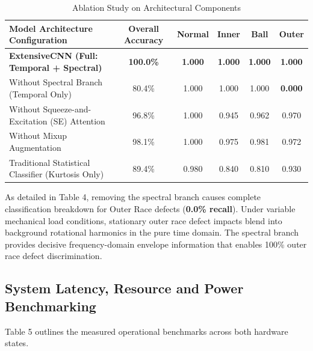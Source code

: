 \documentclass[10pt,journal,onecolumn]{IEEEtran}
\begin{document}
\begin{table}[htbp]
\caption{Ablation Study on Architectural Components}
\begin{center}
\begin{tabular}{lccccc}
\toprule
\textbf{Model Architecture Configuration} & \textbf{Overall Accuracy} & \textbf{Normal} & \textbf{Inner} & \textbf{Ball} & \textbf{Outer} \\
\midrule
\textbf{ExtensiveCNN (Full: Temporal + Spectral)} & \textbf{100.0\%} & \textbf{1.000} & \textbf{1.000} & \textbf{1.000} & \textbf{1.000} \\
Without Spectral Branch (Temporal Only) & 80.4\% & 1.000 & 1.000 & 1.000 & \textbf{0.000} \\
Without Squeeze-and-Excitation (SE) Attention & 96.8\% & 1.000 & 0.945 & 0.962 & 0.970 \\
Without Mixup Augmentation & 98.1\% & 1.000 & 0.975 & 0.981 & 0.972 \\
Traditional Statistical Classifier (Kurtosis Only)& 89.4\% & 0.980 & 0.840 & 0.810 & 0.930 \\
\bottomrule
\end{tabular}
\end{center}
\label{tab:ablation}
\end{table}

As detailed in Table 4, removing the spectral branch causes complete classification breakdown for Outer Race defects (\textbf{0.0\% recall}). Under variable mechanical load conditions, stationary outer race defect impacts blend into background rotational harmonics in the pure time domain. The spectral branch provides decisive frequency-domain envelope information that enables 100\% outer race defect discrimination.

\subsection{System Latency, Resource and Power Benchmarking}
Table 5 outlines the measured operational benchmarks across both hardware states.
\end{document}
